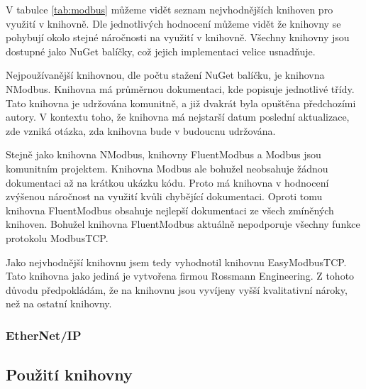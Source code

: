 V tabulce \ref{tab:modbus} můžeme vidět seznam nejvhodnějších knihoven pro využití v knihovně. Dle jednotlivých hodnocení můžeme vidět že knihovny se pohybují okolo stejné náročnosti na využití v knihovně. Všechny knihovny jsou dostupné jako NuGet balíčky, což jejich implementaci velice usnadňuje.

Nejpoužívanější knihovnou, dle počtu stažení NuGet balíčku, je knihovna NModbus. Knihovna má průměrnou dokumentaci, kde popisuje jednotlivé třídy. Tato knihovna je udržována komunitně, a již dvakrát byla opuštěna předchozími autory. V kontextu toho, že knihovna má nejstarší datum poslední aktualizace, zde vzniká otázka, zda knihovna bude v budoucnu udržována.

Stejně jako knihovna NModbus, knihovny FluentModbus a Modbus jsou komunitním projektem. Knihovna Modbus ale bohužel neobsahuje žádnou dokumentaci až na krátkou ukázku kódu. Proto má knihovna v hodnocení zvýšenou náročnost na využití kvůli chybějící dokumentaci. Oproti tomu knihovna FluentModbus obsahuje nejlepší dokumentaci ze všech zmíněných knihoven. Bohužel knihovna FluentModbus aktuálně nepodporuje všechny funkce protokolu ModbusTCP. 

Jako nejvhodnější knihovnu jsem tedy vyhodnotil knihovnu EasyModbusTCP. Tato knihovna jako jediná je vytvořena firmou Rossmann Engineering. Z tohoto důvodu předpokládám, že na knihovnu jsou vyvíjeny vyšší kvalitativní nároky, než na ostatní knihovny.  

\begin{table}[H]\centering
    \caption{Seznam dostupných knihoven pro protokol ModbusTCP}
    \label{tab:modbus}
\end{table}

\subsubsection{EtherNet/IP}



\subsection{Použití knihovny} 